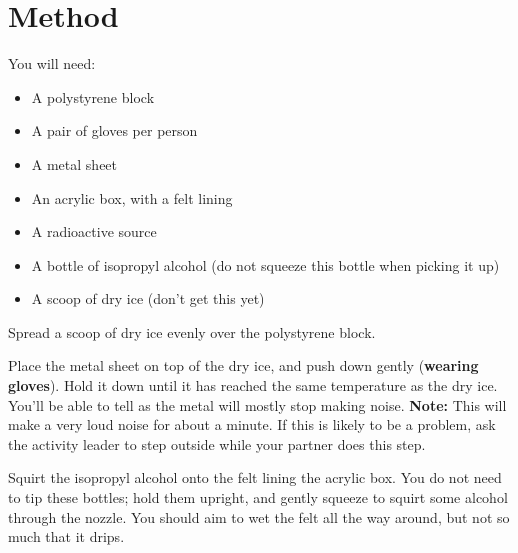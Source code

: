 \documentclass{article}
\begin{document}
\section{Method}

You will need:
\begin{multicols}{2}
\begin{itemize}
    \item A polystyrene block
    \item A pair of gloves per person
    \item A metal sheet
    \item An acrylic box, with a felt lining
    \item A radioactive source
    \item A bottle of isopropyl alcohol (do not squeeze this bottle when picking
    it up)
    \item A scoop of dry ice (don't get this yet)
\end{itemize}
\end{multicols}


\Step{} Spread a scoop of dry ice evenly over the polystyrene block.


\Step{} Place the metal sheet on top of the dry ice, and push down gently
(\textbf{wearing gloves}). Hold it down until it has reached the same
temperature as the dry ice. You'll be able to tell as the metal will mostly stop
making noise. \textbf{Note:} This will make a very loud noise for about a
minute. If this is likely to be a problem, ask the activity leader to step
outside while your partner does this step.

\Step{} Squirt the isopropyl alcohol onto the felt lining the acrylic box. You
do not need to tip these bottles; hold them upright, and gently squeeze to
squirt some alcohol through the nozzle. You should aim to wet the felt all the
way around, but not so much that it drips.

\end{document}

